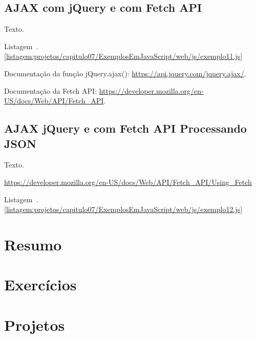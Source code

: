 \subsection{AJAX com jQuery e com Fetch API}

Texto.

Listagem~\thechapter.\ref{listagem:projetos/capitulo07/ExemplosEmJavaScript/web/js/exemplo11.js}


\begin{saibaMais}
    Documentação da função jQuery.ajax(): \url{https://api.jquery.com/jquery.ajax/}.
\end{saibaMais}

\begin{saibaMais}
    Documentação da Fetch API: \url{https://developer.mozilla.org/en-US/docs/Web/API/Fetch_API}.
\end{saibaMais}


\subsection{AJAX jQuery e com Fetch API Processando JSON}

Texto.

\url{https://developer.mozilla.org/en-US/docs/Web/API/Fetch_API/Using_Fetch}

Listagem~\thechapter.\ref{listagem:projetos/capitulo07/ExemplosEmJavaScript/web/js/exemplo12.js}



\section{Resumo}


\section{Exercícios}


\section{Projetos}
